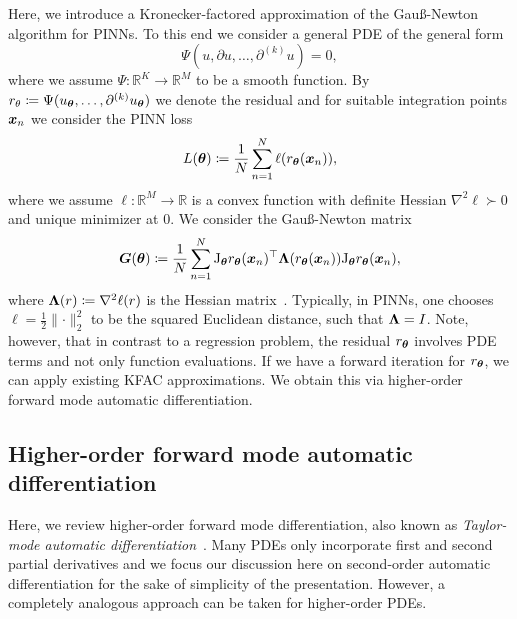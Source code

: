 Here, we introduce a Kronecker-factored approximation of the Gauß-Newton algorithm for PINNs. 
To this end we consider a general PDE of the general form 
\begin{equation}
    \Psi(u, \partial u, \dots, \partial^{(k)} u) = 0,
\end{equation}
where we assume $\Psi\colon \mathbb R^K\to\mathbb R^M$ to be a smooth function.
By $r_\theta\coloneqq \Psi(u_{\bm{\theta}}, \dots, \partial^{(k)} u_{\bm{\theta}})$ we denote the residual and for suitable integration points ${\bm{x}}_n$ we consider the PINN loss
\begin{equation}
    L({\bm{\theta}})\coloneqq \frac1N\sum_{n=1}^N \ell(r_{{\bm{\theta}}}({\bm{x}}_n)),
\end{equation}
where we assume $\ell\colon\mathbb R^M\to\mathbb R$ is a convex function with definite Hessian $\nabla^2\ell\succ0$ and unique minimizer at $0$. 
We consider the Gauß-Newton matrix
\begin{equation}
    {\bm{G}}({\bm{\theta}}) \coloneqq \frac1N\sum_{n=1}^N \mathrm{J}_{\bm{\theta}} r_{\bm{\theta}}({\bm{x}}_n)^\top {\bm{\Lambda}}(r_{\bm{\theta}}({\bm{x}}_n)) \mathrm{J}_{\bm{\theta}} r_{\bm{\theta}}({\bm{x}}_n),
\end{equation}
where ${\bm{\Lambda}}(r)\coloneqq \nabla^2 \ell(r)$ is the Hessian matrix~\citep{eschenhagen2023kroneckerfrwtactored}. 
Typically, in PINNs, one chooses $\ell = \frac12\lVert \cdot \rVert_2^2$ to be the squared Euclidean distance, such that ${\bm{\Lambda}} = I$. 
Note, however, that in contrast to a regression problem, the residual $r_{\bm{\theta}}$ involves PDE terms and not only function evaluations. 
If we have a forward iteration for $r_{\bm{\theta}}$, we can apply existing KFAC approximations. 
We obtain this via higher-order forward mode automatic differentiation. 

\subsection{Higher-order forward mode automatic differentiation}
\label{sec:taylor-mode-AD}

Here, we review higher-order forward mode differentiation, also known as \emph{Taylor-mode automatic differentiation}~\citep{griewank1996algorithm, griewank2008evaluating, bettencourt2019taylor}. 
Many PDEs only incorporate first and second partial derivatives and we focus our discussion here on second-order automatic differentiation for the sake of simplicity of the presentation. 
However, a completely analogous approach can be taken for higher-order PDEs. 

